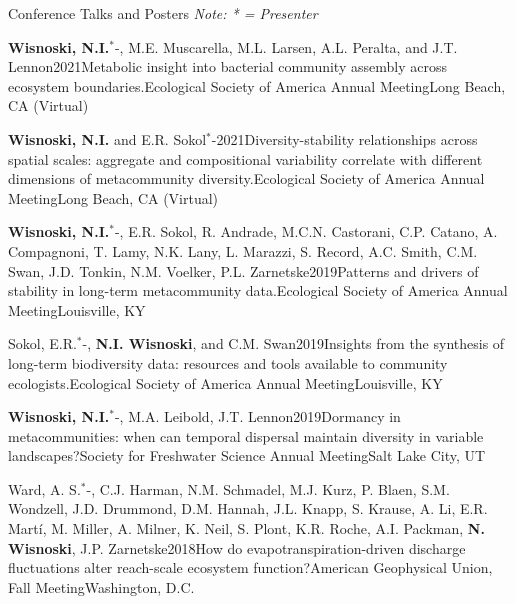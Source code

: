 \documentclass{resume} %
\newcommand{\Star}{\ensuremath{^*}\kern-\scriptspace}
\begin{document}
\bigskip
\begin{rhangSection}{Conference Talks and Posters}
\emph{\small Note: * = Presenter}

    \begin{Presentation}{{\bf Wisnoski, N.I.}\Star, M.E. Muscarella, M.L. Larsen, A.L. Peralta, and J.T. Lennon}{2021}{Metabolic insight into bacterial community assembly across ecosystem boundaries.}{Ecological Society of America Annual Meeting}{Long Beach, CA (Virtual)}
    \end{Presentation}
    
    \begin{Presentation}{{\bf Wisnoski, N.I.} and E.R. Sokol\Star}{2021}{Diversity-stability relationships across spatial scales: aggregate and compositional variability correlate with different dimensions of metacommunity diversity.}{Ecological Society of America Annual Meeting}{Long Beach, CA (Virtual)}
    \end{Presentation}

    \begin{Presentation}{{\bf Wisnoski, N.I.}\Star, E.R. Sokol, R. Andrade, M.C.N. Castorani, C.P. Catano, A. Compagnoni, T. Lamy, N.K. Lany, L. Marazzi, S. Record, A.C. Smith, C.M. Swan, J.D. Tonkin, N.M. Voelker, P.L. Zarnetske}{2019}{Patterns and drivers of stability in long-term metacommunity data.}{Ecological Society of America Annual Meeting}{Louisville, KY}
  \end{Presentation}
  
  \begin{Presentation}{Sokol, E.R.\Star, {\bf N.I. Wisnoski}, and C.M. Swan}{2019}{Insights from the synthesis of long-term biodiversity data: resources and tools available to community ecologists.}{Ecological Society of America Annual Meeting}{Louisville, KY}
  \end{Presentation}
  
   \begin{Presentation}{{\bf Wisnoski, N.I.}\Star, M.A. Leibold, J.T. Lennon}{2019}{Dormancy in metacommunities: when can temporal dispersal maintain diversity in variable landscapes?}{Society for Freshwater Science Annual Meeting}{Salt Lake City, UT}
  \end{Presentation}
  
  \begin{Presentation}{Ward, A. S.\Star, C.J. Harman, N.M. Schmadel, M.J. Kurz, P. Blaen, S.M. Wondzell, J.D. Drummond, D.M. Hannah, J.L. Knapp, S. Krause, A. Li, E.R. Martí, M. Miller, A. Milner, K. Neil, S. Plont, K.R. Roche, A.I. Packman, {\bf N. Wisnoski}, J.P. Zarnetske}{2018}{How do evapotranspiration-driven discharge fluctuations alter reach-scale ecosystem function?}{American Geophysical Union, Fall Meeting}{Washington, D.C.}
  \end{Presentation}
  

\end{rhangSection}
\end{document}
